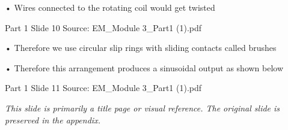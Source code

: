 \documentclass[11pt,a4paper]{article}
\begin{document}
\begin{mdframed}[roundcorner=9pt,backgroundcolor=white,linecolor=anthOrange,linewidth=1pt,innerleftmargin=12pt,innerrightmargin=12pt,innertopmargin=10pt,innerbottommargin=10pt,skipabove=8pt,skipbelow=10pt]
{\HeadingFont\fontsize{15}{18}\selectfont\color{anthDark}• Wires connected to the rotating coil would get twisted\par}
{\color{anthMid}\small Part 1 \textbullet{} Slide 10 \textbullet{} Source: EM\_Module 3\_Part1 (1).pdf\par}
\vspace{0.5em}
{\small
• Therefore we use circular slip rings with sliding contacts called brushes\\

}
\end{mdframed}

\begin{mdframed}[roundcorner=9pt,backgroundcolor=white,linecolor=anthBlue,linewidth=1pt,innerleftmargin=12pt,innerrightmargin=12pt,innertopmargin=10pt,innerbottommargin=10pt,skipabove=8pt,skipbelow=10pt]
{\HeadingFont\fontsize{15}{18}\selectfont\color{anthDark}• Therefore this arrangement produces a sinusoidal output as shown below\par}
{\color{anthMid}\small Part 1 \textbullet{} Slide 11 \textbullet{} Source: EM\_Module 3\_Part1 (1).pdf\par}
\vspace{0.5em}
{\small
\textit{This slide is primarily a title page or visual reference. The original slide is preserved in the appendix.}

}
\end{mdframed}
\end{document}
